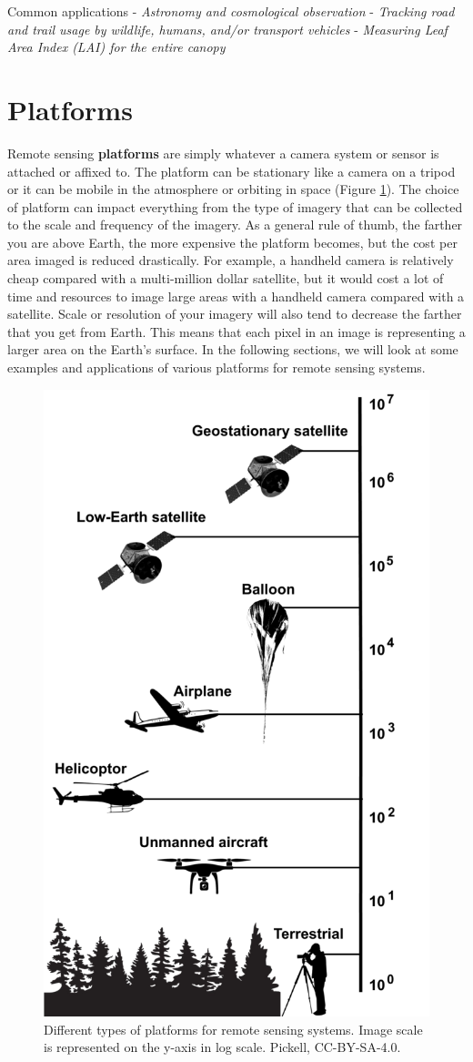 \documentclass[
]{book}
\begin{document}
Common applications
- \emph{Astronomy and cosmological observation}
- \emph{Tracking road and trail usage by wildlife, humans, and/or transport vehicles}
- \emph{Measuring Leaf Area Index (LAI) for the entire canopy}

\section{Platforms}\label{platforms}

Remote sensing \textbf{platforms} are simply whatever a camera system or sensor is attached or affixed to. The platform can be stationary like a camera on a tripod or it can be mobile in the atmosphere or orbiting in space (Figure \ref{fig:12-platforms}). The choice of platform can impact everything from the type of imagery that can be collected to the scale and frequency of the imagery. As a general rule of thumb, the farther you are above Earth, the more expensive the platform becomes, but the cost per area imaged is reduced drastically. For example, a handheld camera is relatively cheap compared with a multi-million dollar satellite, but it would cost a lot of time and resources to image large areas with a handheld camera compared with a satellite. Scale or resolution of your imagery will also tend to decrease the farther that you get from Earth. This means that each pixel in an image is representing a larger area on the Earth's surface. In the following sections, we will look at some examples and applications of various platforms for remote sensing systems.

\begin{figure}
\includegraphics[width=0.5\linewidth]{images/12-platforms} \caption{Different types of platforms for remote sensing systems. Image scale is represented on the y-axis in log scale. Pickell, CC-BY-SA-4.0.}\label{fig:12-platforms}
\end{figure}
\end{document}
